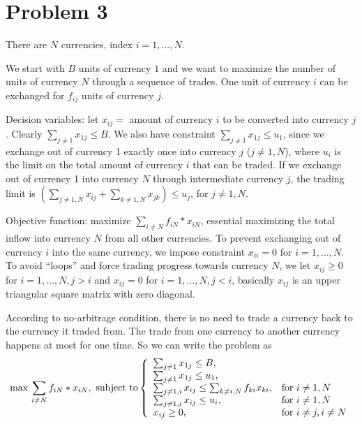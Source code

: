 \documentclass{article}
\begin{document}
\section{Problem 3}
There are $N$ currencies, index $i=1,\dots,N$.

We start with $B$ units of currency $1$ and we want to maximize the number
of units of currency $N$ through a sequence of trades. One unit of 
currency $i$ can be exchanged for $f_{ij}$ units of currency $j$.

Decision variables: let $x_{ij} =$ amount of currency $i$ to be converted 
into currency $j$. Clearly $\sum_{j\not= 1}x_{1j}\leq B$. We also have 
constraint $\sum_{j\not= 1}x_{1j}\leq u_1$, since we exchange out of 
currency 1 exactly once into currency $j$ ($j \not= 1,N$), 
where $u_i$ is the limit on the total amount of currency $i$ that can be
traded. If we exchange out of currency 1 into currency $N$ through 
intermediate currency $j$, the trading limit is
$(\sum_{j \not= 1,N}x_{ij} + \sum_{k \not= 1,N}x_{jk}) \leq u_j$, for $j \not= 1,N$.

Objective function: maximize $\sum_{i \not= N} f_{iN} * x_{iN}$, essential
maximizing the total inflow into currency $N$ from all other currencies.
To prevent exchanging out of currency $i$ into the same currency, 
we impose constraint $x_{ii}=0$ for $i=1,\dots,N$. To avoid ``loops''
and force trading progress towards currency $N$, we let 
$x_{ij}\geq 0$ for $i=1,\dots,N, j>i$ and $x_{ij}=0$ for $i=1,\dots,N, j<i$,
basically $x_{ij}$ is an upper triangular square matrix with zero diagonal.

According to no-arbitrage condition, there is no need to trade a currency back to 
the currency it traded from. The trade from one currency to another currency happens at most for one time. So we can write the problem as 
\begin{equation}  
\max \,\sum_{i \not= N} f_{iN} * x_{iN}, \text{ subject to}
\left\{  
             \begin{array}{ll}
             \sum_{j\not= 1}x_{1j}\leq B,\\
             \sum_{j\not= 1}x_{1j}\leq u_1,\\
             \sum_{j\not= 1, i}x_{ij}\leq \sum_{k\not=i,N}f_{ki} x_{ki},& \textnormal{for~} i\not= 1,N\\
             \sum_{j\not= 1, i}x_{ij}\leq u_i,& \textnormal{for~} i\not= 1,N\\
             x_{ij}\geq 0, & \textnormal{for~} i\not= j,i\not=N
             \end{array}  
\right.  
\end{equation}  
\end{document}

